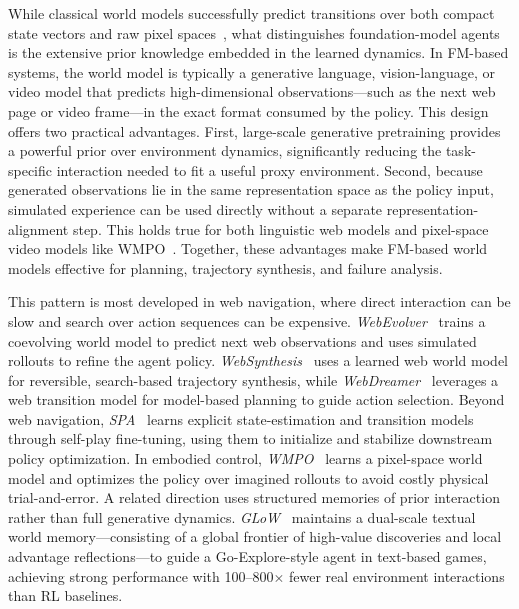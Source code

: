 \documentclass{article}
\begin{document}
While classical world models successfully predict transitions over both compact state vectors and raw pixel spaces~\citep{ha2018world}, what distinguishes foundation-model agents is the extensive prior knowledge embedded in the learned dynamics. In FM-based systems, the world model is typically a generative language, vision-language, or video model that predicts high-dimensional observations—such as the next web page or video frame—in the exact format consumed by the policy. This design offers two practical advantages. First, large-scale generative pretraining provides a powerful prior over environment dynamics, significantly reducing the task-specific interaction needed to fit a useful proxy environment. Second, because generated observations lie in the same representation space as the policy input, simulated experience can be used directly without a separate representation-alignment step. This holds true for both linguistic web models and pixel-space video models like WMPO~\citep{zhu2025wmpoworldmodelbasedpolicy}. Together, these advantages make FM-based world models effective for planning, trajectory synthesis, and failure analysis.


This pattern is most developed in web navigation, where direct interaction can be slow and search over action sequences can be expensive. \textit{WebEvolver}~\citep{fang2025webevolver} trains a coevolving world model to predict next web observations and uses simulated rollouts to refine the agent policy. \textit{WebSynthesis}~\citep{gao2025websynthesisworldmodelguidedmctsefficient} uses a learned web world model for reversible, search-based trajectory synthesis, while \textit{WebDreamer}~\citep{gu2025is} leverages a web transition model for model-based planning to guide action selection. Beyond web navigation, \textit{SPA}~\citep{chen2025internalizingworldmodelsselfplay} learns explicit state-estimation and transition models through self-play fine-tuning, using them to initialize and stabilize downstream policy optimization. In embodied control, \textit{WMPO}~\citep{zhu2025wmpoworldmodelbasedpolicy} learns a pixel-space world model and optimizes the policy over imagined rollouts to avoid costly physical trial-and-error. A related direction uses structured memories of prior interaction rather than full generative dynamics. \textit{GLoW}~\citep{kim2025dualscaleworldmodelsllm} maintains a dual-scale textual world memory—consisting of a global frontier of high-value discoveries and local advantage reflections—to guide a Go-Explore-style agent in text-based games, achieving strong performance with 100--800$\times$ fewer real environment interactions than RL baselines.
\end{document}
